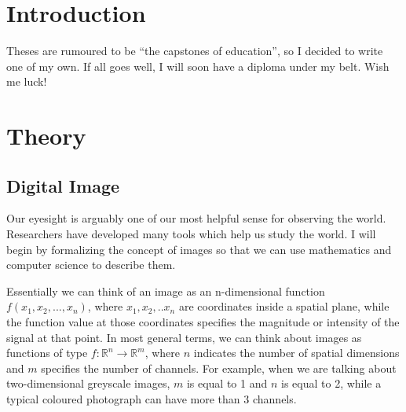 \documentclass[
  digital,     %
  oneside,     %
  nosansbold,  %
  nocolorbold, %
  lof,         %
  lot,         %
]{fithesis4}
\newcommand*{\R}{\ensuremath{\mathbb{R}}}
\begin{document}
\chapter*{Introduction}

Theses are rumoured to be \enquote{the capstones of education}, so
I decided to write one of my own. If all goes well, I will soon
have a diploma under my belt. Wish me luck!

\chapter{Theory}

\section{Digital Image}

Our eyesight is arguably one of our most helpful sense for observing the world.
Researchers have developed many tools which help us study the world. I will
begin by formalizing the concept of images so that we can use mathematics
and computer science to describe them.

Essentially we can think of an image as an n-dimensional function $f(x_1, x_2,
..., x_n)$, where $x_1, x_2, .. x_n$ are coordinates inside a spatial plane,
while the function value at those coordinates specifies the magnitude or intensity
of the signal at that point. In most general terms, we can think about images as
functions of type $f:\R^n \rightarrow \R^m$, where $n$ indicates the number of
spatial dimensions and $m$ specifies the number of channels. For example, when
we are talking about two-dimensional greyscale images, $m$ is equal to 1 and $n$ is
equal to 2, while a typical coloured photograph can have more than 3 channels.
\end{document}
